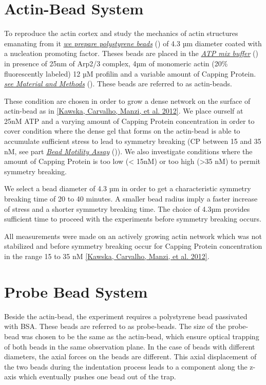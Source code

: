 \documentclass[A4paperpaper,11pt,english]{sphinxmanual}
\begin{document}
\section{Actin-Bead System}
\label{index-latex:actin-bead-system}
To reproduce the actin cortex and study the mechanics of actin structures
emanating from it {\hyperref[index-latex:bead-preparation]{\emph{we prepare polystyrene beads}}} () of 4.3
µm diameter coated with a nucleation promoting factor. Theses beads are placed
in the {\hyperref[index-latex:atp-mix-buffer]{\emph{ATP mix buffer}}} () in presence of 25nm of Arp2/3
complex, 4µm of monomeric actin (20\% fluorescently labeled) 12 µM profilin and
a variable amount of Capping Protein. {\hyperref[index-latex:m-et-m]{\emph{see Material and Methods}}} ().
These beads are referred to as actin-beads.

These condition are chosen in order to grow a dense network on the surface of
actin-bead as in {\hyperref[index-latex:kawska2012]{{[}Kawska, Carvalho, Manzi,  et al.  2012{]}}}. We place ourself at 25nM ATP and a varying
amount of Capping Protein concentration in order to cover condition where the
dense gel that forms on the actin-bead is able to accumulate sufficient stress
to lead to symmetry breaking (CP between 15  and 35 nM, see part {\hyperref[index-latex:bead-motility-assay]{\emph{Bead Motility Assay}}} ()). We also investigate
conditions where the amount of Capping Protein is too low (\textless{} 15nM) or too high
(\textgreater{}35 nM) to permit symmetry breaking.

We select a bead diameter of 4.3 µm in order to get a characteristic symmetry
breaking time of 20 to 40 minutes.
A smaller bead radius imply a
faster increase of stress and a shorter symmetry breaking time.
The choice of 4.3µm provides sufficient time to proceed with the
experiments before symmetry breaking occurs.

All measurements were made on an actively growing actin network which
was not stabilized and before symmetry breaking
occur for Capping Protein concentration in the range 15 to 35 nM {\hyperref[index-latex:kawska2012]{{[}Kawska, Carvalho, Manzi,  et al.  2012{]}}}.


\section{Probe Bead System}
\label{index-latex:probe-bead-system}
Beside the actin-bead, the experiment requires a polystyrene bead passivated
with BSA. These beads are referred to as probe-beads.  The size of the
probe-bead was chosen to be the same as the actin-bead, which ensure optical
trapping of both beads in the same observation plane. In the case of beads with
different diameters, the axial forces on the beads are different. This axial
displacement of the two beads during the indentation process leads to a
component along the z-axis which  eventually pushes one bead out of the trap.
\end{document}
